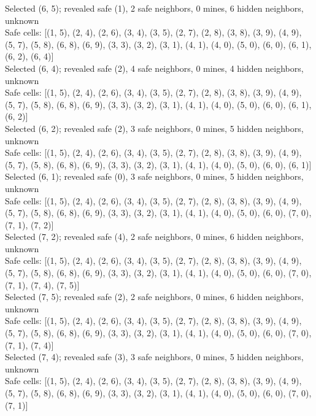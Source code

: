 \documentclass[11pt]{article} %
\begin{document}
Selected (6, 5); revealed safe (1), 2 safe neighbors, 0 mines, 6 hidden neighbors, unknown\\
Safe cells: [(1, 5), (2, 4), (2, 6), (3, 4), (3, 5), (2, 7), (2, 8), (3, 8), (3, 9), (4, 9), (5, 7), (5, 8), (6, 8), (6, 9), (3, 3), (3, 2), (3, 1), (4, 1), (4, 0), (5, 0), (6, 0), (6, 1), (6, 2), (6, 4)]\\
Selected (6, 4); revealed safe (2), 4 safe neighbors, 0 mines, 4 hidden neighbors, unknown\\
Safe cells: [(1, 5), (2, 4), (2, 6), (3, 4), (3, 5), (2, 7), (2, 8), (3, 8), (3, 9), (4, 9), (5, 7), (5, 8), (6, 8), (6, 9), (3, 3), (3, 2), (3, 1), (4, 1), (4, 0), (5, 0), (6, 0), (6, 1), (6, 2)]\\
Selected (6, 2); revealed safe (2), 3 safe neighbors, 0 mines, 5 hidden neighbors, unknown\\
Safe cells: [(1, 5), (2, 4), (2, 6), (3, 4), (3, 5), (2, 7), (2, 8), (3, 8), (3, 9), (4, 9), (5, 7), (5, 8), (6, 8), (6, 9), (3, 3), (3, 2), (3, 1), (4, 1), (4, 0), (5, 0), (6, 0), (6, 1)]\\
Selected (6, 1); revealed safe (0), 3 safe neighbors, 0 mines, 5 hidden neighbors, unknown\\
Safe cells: [(1, 5), (2, 4), (2, 6), (3, 4), (3, 5), (2, 7), (2, 8), (3, 8), (3, 9), (4, 9), (5, 7), (5, 8), (6, 8), (6, 9), (3, 3), (3, 2), (3, 1), (4, 1), (4, 0), (5, 0), (6, 0), (7, 0), (7, 1), (7, 2)]\\
Selected (7, 2); revealed safe (4), 2 safe neighbors, 0 mines, 6 hidden neighbors, unknown\\
Safe cells: [(1, 5), (2, 4), (2, 6), (3, 4), (3, 5), (2, 7), (2, 8), (3, 8), (3, 9), (4, 9), (5, 7), (5, 8), (6, 8), (6, 9), (3, 3), (3, 2), (3, 1), (4, 1), (4, 0), (5, 0), (6, 0), (7, 0), (7, 1), (7, 4), (7, 5)]\\
Selected (7, 5); revealed safe (2), 2 safe neighbors, 0 mines, 6 hidden neighbors, unknown\\
Safe cells: [(1, 5), (2, 4), (2, 6), (3, 4), (3, 5), (2, 7), (2, 8), (3, 8), (3, 9), (4, 9), (5, 7), (5, 8), (6, 8), (6, 9), (3, 3), (3, 2), (3, 1), (4, 1), (4, 0), (5, 0), (6, 0), (7, 0), (7, 1), (7, 4)]\\
Selected (7, 4); revealed safe (3), 3 safe neighbors, 0 mines, 5 hidden neighbors, unknown\\
Safe cells: [(1, 5), (2, 4), (2, 6), (3, 4), (3, 5), (2, 7), (2, 8), (3, 8), (3, 9), (4, 9), (5, 7), (5, 8), (6, 8), (6, 9), (3, 3), (3, 2), (3, 1), (4, 1), (4, 0), (5, 0), (6, 0), (7, 0), (7, 1)]\\
\end{document}
